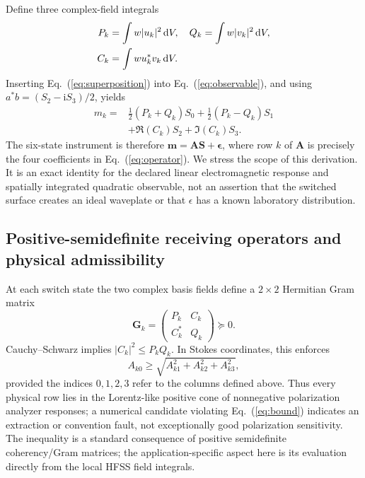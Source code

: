 \documentclass{ieeeaccess}
\newcommand{\Svec}{\boldsymbol{S}}
\newcommand{\Avec}{\boldsymbol{A}}
\newcommand{\mvec}{\boldsymbol{m}}
\newcommand{\cpx}{\mathrm{i}}
\begin{document}
Define three complex-field integrals
\begin{align}
P_k&=\int w|u_k|^2\,\mathrm{d}V,\quad Q_k=\int w|v_k|^2\,\mathrm{d}V,\notag\\
C_k&=\int w u_k^*v_k\,\mathrm{d}V.
\label{eq:overlaps}
\end{align}
Inserting Eq.~(\ref{eq:superposition}) into Eq.~(\ref{eq:observable}), and using $a^*b=(S_2-\cpx S_3)/2$, yields
\begin{equation}
\boxed{\begin{aligned}
m_k={}&\tfrac12(P_k+Q_k)S_0+\tfrac12(P_k-Q_k)S_1\\
&+\Re(C_k)S_2+\Im(C_k)S_3.
\end{aligned}}
\label{eq:operator}
\end{equation}
The six-state instrument is therefore $\mvec=\Avec\Svec+\boldsymbol{\epsilon}$, where row $k$ of $\Avec$ is precisely the four coefficients in Eq.~(\ref{eq:operator}). We stress the scope of this derivation. It is an exact identity for the declared linear electromagnetic response and spatially integrated quadratic observable, not an assertion that the switched surface creates an ideal waveplate or that $\epsilon$ has a known laboratory distribution.

\subsection{Positive-semidefinite receiving operators and physical admissibility}
At each switch state the two complex basis fields define a $2\times2$ Hermitian Gram matrix
\begin{equation}
\mathbf{G}_k=\begin{pmatrix}P_k&C_k\\C_k^*&Q_k\end{pmatrix}\succeq0.
\label{eq:gram}
\end{equation}
Cauchy--Schwarz implies $|C_k|^2\le P_kQ_k$. In Stokes coordinates, this enforces
\begin{equation}
A_{k0}\ge\sqrt{A_{k1}^2+A_{k2}^2+A_{k3}^2},
\label{eq:bound}
\end{equation}
provided the indices $0,1,2,3$ refer to the columns defined above. Thus every physical row lies in the Lorentz-like positive cone of nonnegative polarization analyzer responses; a numerical candidate violating Eq.~(\ref{eq:bound}) indicates an extraction or convention fault, not exceptionally good polarization sensitivity. The inequality is a standard consequence of positive semidefinite coherency/Gram matrices\cite{Azzam1990}; the application-specific aspect here is its evaluation directly from the local HFSS field integrals.
\end{document}
